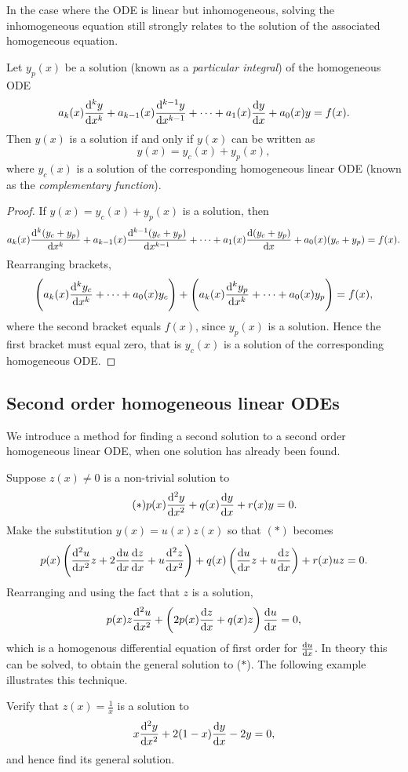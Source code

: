 In the case where the ODE is linear but inhomogeneous, solving the inhomogeneous equation still strongly relates to the solution of the associated homogeneous equation.

\begin{theorem}\label{thrm:linear-inhomogeneous-ode}
Let $y_p(x)$ be a solution (known as a \emph{particular integral}) of the homogeneous ODE
\[a_k(x)\dv[k]{y}{x}+a_{k-1}(x)\dv[k-1]{y}{x}+\cdots+a_1(x)\dv{y}{x}+a_0(x)y=f(x).\]
Then $y(x)$ is a solution if and only if $y(x)$ can be written as
\[y(x)=y_c(x)+y_p(x),\]
where $y_c(x)$ is a solution of the corresponding homogeneous linear ODE (known as the \emph{complementary function}).
\end{theorem}

\begin{proof}
If $y(x)=y_c(x)+y_p(x)$ is a solution, then
\[a_k(x)\dv[k]{(y_c+y_p)}{x}+a_{k-1}(x)\dv[k-1]{(y_c+y_p)}{x}+\cdots+a_1(x)\dv{(y_c+y_p)}{x}+a_0(x)(y_c+y_p)=f(x).\]
Rearranging brackets,
\[\left(a_k(x)\dv[k]{y_c}{x}+\cdots+a_0(x)y_c\right)+\left(a_k(x)\dv[k]{y_p}{x}+\cdots+a_0(x)y_p\right)=f(x),\]
where the second bracket equals $f(x)$, since $y_p(x)$ is a solution. Hence the first bracket must equal zero, that is $y_c(x)$ is a solution of the corresponding homogeneous ODE.
\end{proof}

\subsection{Second order homogeneous linear ODEs}
We introduce a method for finding a second solution to a second order homogeneous linear ODE, when one solution has already been found.

Suppose $z(x)\neq0$ is a non-trivial solution to
\begin{equation*}\tag{$\ast$}
p(x)\dv[2]{y}{x}+q(x)\dv{y}{x}+r(x)y=0.
\end{equation*}
Make the substitution $y(x)=u(x)z(x)$ so that $(\ast)$ becomes
\[p(x)\left(\dv[2]{u}{x}z+2\dv{u}{x}\dv{z}{x}+u\dv[2]{z}{x}\right)+q(x)\left(\dv{u}{x}z+u\dv{z}{x}\right)+r(x)uz=0.\]
Rearranging and using the fact that $z$ is a solution,
\[p(x)z\dv[2]{u}{x}+\left(2p(x)\dv{z}{x}+q(x)z\right)\dv{u}{x}=0,\]
which is a homogenous differential equation of first order for $\dv{u}{x}$. In theory this can be solved, to obtain the general solution to ($\ast$). The following example illustrates this technique.

\begin{exercise}
Verify that $z(x)=\frac{1}{x}$ is a solution to
\[x\dv[2]{y}{x}+2(1-x)\dv{y}{x}-2y=0,\]
and hence find its general solution.
\end{exercise}

